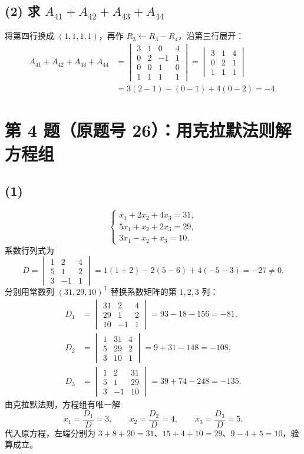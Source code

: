 \documentclass[11pt,a4paper,fontset=fandol]{ctexart}
\newcommand{\T}{^{\mathsf T}}
\newcommand{\ans}[1]{\boxed{#1}}
\begin{document}
\subsection*{(2) 求 $A_{41}+A_{42}+A_{43}+A_{44}$}
将第四行换成 $(1,1,1,1)$，再作 $R_3\leftarrow R_3-R_4$，沿第三行展开：
\begin{align*}
A_{41}+A_{42}+A_{43}+A_{44}
&=\begin{vmatrix}3&1&0&4\\0&2&-1&1\\0&0&1&0\\1&1&1&1\end{vmatrix}
=\begin{vmatrix}3&1&4\\0&2&1\\1&1&1\end{vmatrix}\\
&=3(2-1)-(0-1)+4(0-2)=\ans{-4}.
\end{align*}

\newpage
\section*{第 4 题（原题号 26）：用克拉默法则解方程组}

\subsection*{(1)}
\[
\begin{cases}
x_1+2x_2+4x_3=31,\\
5x_1+x_2+2x_3=29,\\
3x_1-x_2+x_3=10.
\end{cases}
\]
系数行列式为
\[
D=\begin{vmatrix}1&2&4\\5&1&2\\3&-1&1\end{vmatrix}
=1(1+2)-2(5-6)+4(-5-3)=-27\ne0.
\]
分别用常数列 $(31,29,10)\T$ 替换系数矩阵的第 $1,2,3$ 列：
\begin{align*}
D_1&=\begin{vmatrix}31&2&4\\29&1&2\\10&-1&1\end{vmatrix}
 =93-18-156=-81,\\[0.3em]
D_2&=\begin{vmatrix}1&31&4\\5&29&2\\3&10&1\end{vmatrix}
 =9+31-148=-108,\\[0.3em]
D_3&=\begin{vmatrix}1&2&31\\5&1&29\\3&-1&10\end{vmatrix}
 =39+74-248=-135.
\end{align*}
由克拉默法则，方程组有唯一解
\[
\ans{x_1=\frac{D_1}{D}=3,\qquad x_2=\frac{D_2}{D}=4,\qquad
x_3=\frac{D_3}{D}=5}.
\]
代入原方程，左端分别为 $3+8+20=31$、$15+4+10=29$、$9-4+5=10$，验算成立。
\end{document}
